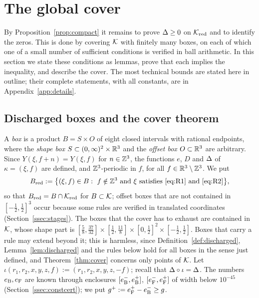 \section{The global cover}\label{sec:cover}

By Proposition~\ref{prop:compact} it remains to prove $\Delta\ge0$ on $\mathcal K_{\mathrm{red}}$ and to identify the zeros. This is done by
covering $\mathcal K$ with finitely many boxes, on each of which one of a small number of sufficient conditions is verified in ball
arithmetic. In this section we state these conditions as lemmas, prove that each implies the inequality, and describe the cover.
The most technical bounds are stated here in outline; their complete statements, with all constants, are in
Appendix~\ref{app:details}.

\subsection{Discharged boxes and the cover theorem}\label{ssec:discharged}

A \emph{box} is a product $B=S\times O$ of eight closed intervals with rational endpoints, where the \emph{shape box}
$S\subset(0,\infty)^2\times\mathbb R^3$ and the \emph{offset box} $O\subset\mathbb R^3$ are arbitrary. Since $Y(\xi,f+n)=Y(\xi,f)$ for
$n\in\mathbb Z^3$, the functions $e$, $D$ and $\Delta$ of $\kappa=(\xi,f)$ are defined, and $\mathbb Z^3$-periodic in $f$, for all
$f\in\mathbb R^3\setminus\mathbb Z^3$. We put
\[
  B_{\mathrm{red}}:=\bigl\{(\xi,f)\in B:\ f\notin\Z^3\text{ and }\xi\text{ satisfies \eqref{eq:R1} and \eqref{eq:R2}}\bigr\},
\]
so that $B_{\mathrm{red}}=B\cap\mathcal K_{\mathrm{red}}$ for $B\subset\mathcal K$; offset boxes that are not contained in $[-\frac12,\frac12]^3$
occur because some rules are verified in translated coordinates (Section~\ref{ssec:stages}). The boxes that the cover has to
exhaust are contained in $\mathcal K$, whose shape part is
$[\frac58,\frac{37}{32}]\times[\frac12,\frac{11}8]\times[0,\frac12]^2\times[-\frac12,\frac12]$. Boxes that carry a rule may extend
beyond it; this is harmless, since Definition~\ref{def:discharged}, Lemma~\ref{lem:discharged} and the rules below hold for all
boxes in the sense just defined, and Theorem~\ref{thm:cover} concerns only points of $\mathcal K$. Let
$\iota(r_1,r_2,x,y,z,f):=(r_1,r_2,x,y,z,-f)$; recall that $\Delta\circ\iota=\Delta$.
The numbers $e_{\mathrm B},e_{\mathrm F}$ are known through enclosures $[e_{\mathrm B}^-,e_{\mathrm B}^+]$, $[e_{\mathrm F}^-,e_{\mathrm F}^+]$ of width below $10^{-45}$
(Section~\ref{ssec:constcert}); we put $g^+:=e_{\mathrm F}^+-e_{\mathrm B}^-\ge g$.

